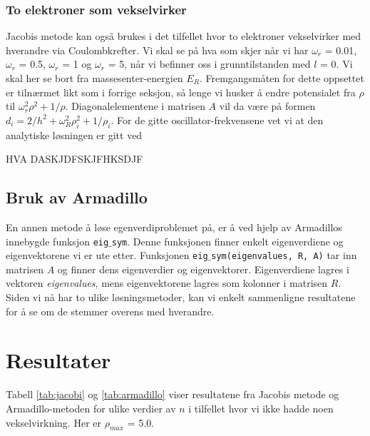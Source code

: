 \documentclass{article}
\begin{document}
\subsubsection{To elektroner som vekselvirker}
Jacobis metode kan også brukes i det tilfellet hvor to elektroner vekselvirker med hverandre via Coulombkrefter. Vi skal se på hva som skjer når vi har $\omega_r$ = 0.01, $\omega_r$ = 0.5, $\omega_r$ = 1 og $\omega_r$ = 5, når vi befinner oss i grunntilstanden med $l$ = 0. Vi skal her se bort fra massesenter-energien $E_R$. Fremgangsmåten for dette oppsettet er tilnærmet likt som i forrige seksjon, så lenge vi husker å endre potensialet fra $\rho$ til $\omega_r^2\rho^2 + 1/\rho $. Diagonalelementene i matrisen $A$ vil da være på formen $d_i = 2/h^2 + \omega_R^2\rho_i^2 + 1/\rho_i$. For de gitte oscillator-frekvensene vet vi at den analytiske løsningen er gitt ved 

HVA DASKJDFSKJFHKSDJF


\subsection{Bruk av Armadillo}
En annen metode å løse egenverdiproblemet på, er å ved hjelp av Armadillos innebygde funksjon \texttt{eig$\_$sym}. Denne funksjonen finner enkelt eigenverdiene og eigenvektorene vi er ute etter. Funksjonen \texttt{eig$\_$sym(eigenvalues, R, A)} tar inn matrisen $A$ og finner dens eigenverdier og eigenvektorer. Eigenverdiene lagres i vektoren \textit{eigenvalues}, mens eigenvektorene lagres som kolonner i matrisen $R$. Siden vi nå har to ulike løsningsmetoder, kan vi enkelt sammenligne resultatene for å se om de stemmer overens med hverandre.



\section{Resultater}
Tabell \ref{tab:jacobi} og \ref{tab:armadillo} viser resultatene fra Jacobis metode og Armadillo-metoden for ulike verdier av $n$ i tilfellet hvor vi ikke hadde noen vekselvirkning. Her er $\rho_{max}$ = 5.0.
\end{document}

